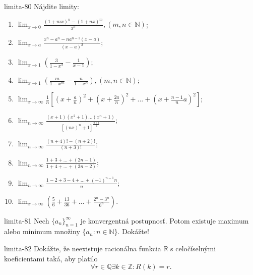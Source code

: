 \begin{defproblem}{limita-80}
Nájdite limity:
\begin{multicols}{2}
\begin{enumerate}
    \item $\lim_{x \rightarrow 0} \frac{(1+mx)^n-(1+nx)^m}{x^2},(m,n \in \mathbb{N})$;
    \item $\lim_{x \rightarrow a} \frac{x^n-a^n-na^{n-1}(x-a)}{(x-a)^2}$;
    \item $\lim_{x \rightarrow 1} (\frac{3}{1-x^2}-\frac{1}{x-1})$;
    \item $\lim_{x \rightarrow 1} (\frac{m}{1-x^m}-\frac{n}{1-x^n}),(m,n \in \mathbb{N})$;
    \item $\lim_{x \rightarrow \infty} \frac{1}{n}[(x+\frac{a}{n})^2+(x+\frac{2a}{n})^2+...+(x+\frac{n-1}{n}a)^2]$;
    \item $\lim_{n\rightarrow \infty} \frac{(x+1)(x^2+1)...(x^n+1)}{[(nx)^n+1]^{\frac{n+1}{2}}}$;
    \item $\lim_{n \rightarrow \infty} \frac{(n+4)!-(n+2)!}{(n+3)!}$;
    \item $\lim_{n \rightarrow \infty} \frac{1+3+...+(2n-1)}{1+4+...+(3n-2)}$;
    \item $\lim_{n \rightarrow \infty} \frac{1-2+3-4+...+(-1)^{n-1}n}{n}$;
    \item $\lim_{x \rightarrow \infty} (\frac{5}{6}+\frac{13}{36}+...+\frac{2^n-3^n}{6^n})$.
\end{enumerate}
\end{multicols}
\end{defproblem}

\begin{defproblem}{limita-81}
Nech ${\{a_n\}}_{n=1}^\infty$ je konvergentná postupnosť. Potom existuje maximum alebo minimum množiny $\{a_n: n \in \mathbb{N}\}$. Dokážte!
\end{defproblem}

\begin{defproblem}{limita-82}
Dokážte, že neexistuje racionálna funkcia $\mathbb{R}$ s celočíselnými koeficientami taká, aby platilo
$$\forall r \in \mathbb{Q} \exists k \in \mathbb{Z}: R(k)=r.$$
\end{defproblem}

